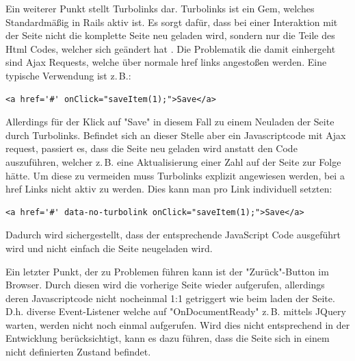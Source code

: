 Ein weiterer Punkt stellt Turbolinks dar. Turbolinks ist ein Gem, welches Standardmäßig in Rails aktiv ist. Es sorgt dafür, dass bei einer Interaktion mit der Seite nicht die komplette Seite neu geladen wird, sondern nur die Teile des Html Codes, welcher sich geändert hat \cite{Gamble.2013}. Die Problematik die damit einhergeht sind Ajax Requests, welche über normale href links angestoßen werden. Eine typische Verwendung ist z.\,B.:
\lstset{
   language=Html
}

\begin{lstlisting}[caption=a href HTML Code, label=code:ch5:html01]
<a href='#' onClick="saveItem(1);">Save</a>
\end{lstlisting}

Allerdings für der Klick auf "Save" in diesem Fall zu einem Neuladen der Seite durch Turbolinks. Befindet sich an dieser Stelle aber ein Javascriptcode mit Ajax request, passiert es, dass die Seite neu geladen wird anstatt den Code auszuführen, welcher z.\,B. eine Aktualisierung einer Zahl auf der Seite zur Folge hätte.
Um diese zu vermeiden muss Turbolinks explizit angewiesen werden, bei a href Links nicht aktiv zu werden. Dies kann man pro Link individuell setzten:

\begin{lstlisting}[caption=a href HTML Code - Turbolinks deaktiviert, label=code:ch5:html01]
<a href='#' data-no-turbolink onClick="saveItem(1);">Save</a>
\end{lstlisting}

Dadurch wird sichergestellt, dass der entsprechende JavaScript Code ausgeführt wird und nicht einfach die Seite neugeladen wird.

Ein letzter Punkt, der zu Problemen führen kann ist der "Zurück"-Button im Browser.
Durch diesen wird die vorherige Seite wieder aufgerufen, allerdings deren Javascriptcode nicht nocheinmal 1:1 getriggert wie beim laden der Seite. D.h. diverse Event-Listener welche auf "OnDocumentReady" z.\,B. mittels JQuery warten, werden nicht noch einmal aufgerufen. Wird dies nicht entsprechend in der Entwicklung berücksichtigt, kann es dazu führen, dass die Seite sich in einem nicht definierten Zustand befindet.
